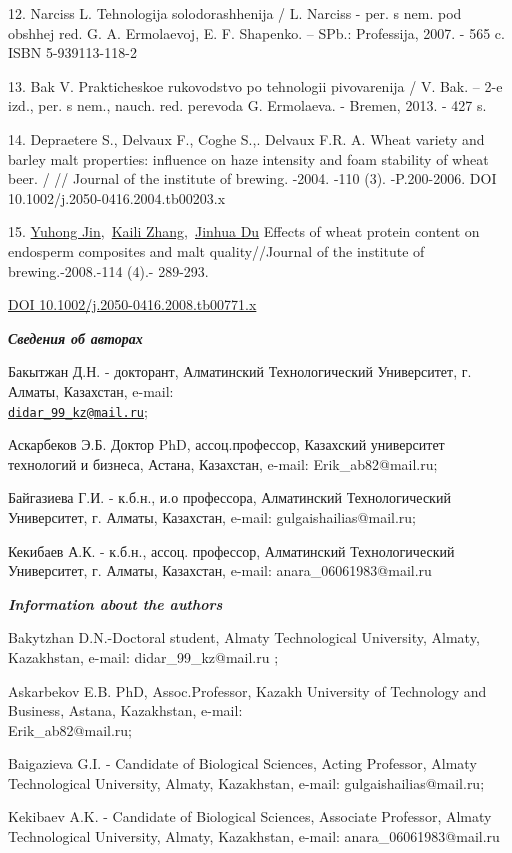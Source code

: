 \begin{references}
12. Narciss L. Tehnologija solodorashhenija / L. Narciss - per. s nem.
pod obshhej red. G. A. Ermolaevoj, E. F. Shapenko. -- SPb.: Professija,
2007. - 565 c. ISBN 5-939113-118-2

13. Bak V. Prakticheskoe rukovodstvo po tehnologii pivovarenija / V.
Bak. -- 2-e izd., per. s nem., nauch. red. perevoda G. Ermolaeva. -
Bremen, 2013. - 427 s.

14. Depraetere S., Delvaux F., Coghe S.,. Delvaux F.R. A. Wheat variety
and barley malt properties: influence on haze intensity and foam
stability of wheat beer. / // Journal of the institute of brewing.
-2004. -110 (3). -P.200-2006. DOI 10.1002/j.2050-0416.2004.tb00203.x

15. \href{https://onlinelibrary.wiley.com/authored-by/Jin/Yuhong}{Yuhong
Jin},~\href{https://onlinelibrary.wiley.com/authored-by/Zhang/Kaili}{Kaili
Zhang},~\href{https://onlinelibrary.wiley.com/authored-by/Du/Jinhua}{Jinhua
Du} Effects of wheat protein content on endosperm composites and malt
quality//Journal of the institute of brewing.-2008.-114 (4).- 289-293.

\href{https://doi.org/10.1002/j.2050-0416.2008.tb00771.x}{DOI
10.1002/j.2050-0416.2008.tb00771.x}
\end{references}

\begin{authorinfo}
\emph{{\bfseries Сведения об авторах}}

Бакытжан Д.Н. - докторант, Алматинский Технологический Университет, г.
Алматы, Казахстан, e-mail:\\
\href{mailto:didar_99_kz@mail.ru}{\nolinkurl{didar\_99\_kz@mail.ru}};

Аскарбеков Э.Б. Доктор PhD, ассоц.профессор, Казахский университет
технологий и бизнеса, Астана, Казахстан, e-mail: Erik\_ab82@mail.ru;

Байгазиева Г.И. - к.б.н., и.о профессора, Алматинский Технологический
Университет, г. Алматы, Казахстан, e-mail: gulgaishailias@mail.ru;

Кекибаев А.К. - к.б.н., ассоц. профессор, Алматинский Технологический
Университет, г. Алматы, Казахстан, e-mail: anara\_06061983@mail.ru

\emph{{\bfseries Information about the authors}}

Bakytzhan D.N.-Doctoral student, Almaty Technological University,
Almaty, Kazakhstan, e-mail: didar\_99\_kz@mail.ru ;

Askarbekov E.B. PhD, Assoc.Professor, Kazakh University of Technology
and Business, Astana, Kazakhstan, e-mail: \\Erik\_ab82@mail.ru;

Baigazieva G.I. - Candidate of Biological Sciences, Acting Professor,
Almaty Technological University, Almaty, Kazakhstan, e-mail:
gulgaishailias@mail.ru;

Kekibaev A.K. - Candidate of Biological Sciences, Associate Professor,
Almaty Technological University, Almaty, Kazakhstan, e-mail:
anara\_06061983@mail.ru
\end{authorinfo}
